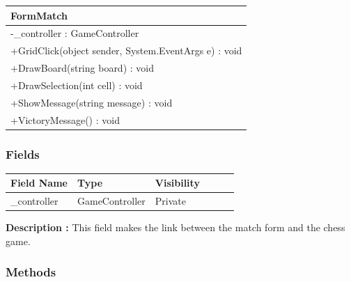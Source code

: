 \documentclass[12pt]{article}
\begin{document}
    \begin{table}[H]
        \begin{tabular}{|l|}
            \hline
            \rowcolor[HTML]{C0C0C0}
            \textbf{FormMatch}                                   \\ \hline
            \rowcolor[HTML]{EFEFEF}
            -\_controller : GameController                       \\ \hline
            \rowcolor[HTML]{FFFFFF}
            +GridClick(object sender, System.EventArgs e) : void \\ \hline
            +DrawBoard(string board) : void                      \\ \hline
            +DrawSelection(int cell) : void                      \\ \hline
            +ShowMessage(string message) : void                  \\ \hline
            +VictoryMessage() : void                             \\ \hline
        \end{tabular}
    \end{table}

    \subsubsection{Fields}

    \begin{table}[H]
        \begin{tabular}{llllll}
            \hline
            \multicolumn{1}{|l|}{\cellcolor[HTML]{EFEFEF}\textbf{Field Name}} & \multicolumn{1}{l|}{\cellcolor[HTML]{EFEFEF}\textbf{Type}} & \multicolumn{1}{l|}{\cellcolor[HTML]{EFEFEF}\textbf{Visibility}} \\ \hline
            \multicolumn{1}{|l|}{\_controller}                                & \multicolumn{1}{l|}{GameController}                        & \multicolumn{1}{l|}{Private}                                     \\ \hline
        \end{tabular}
    \end{table}

    \textbf{Description :} This field makes the link between the match form and the chess game.

    \subsubsection{Methods}
\end{document}
